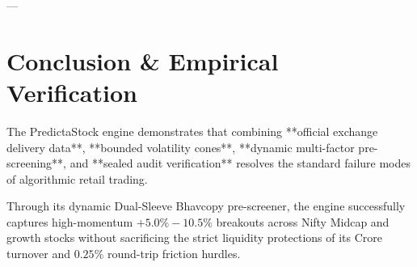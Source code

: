 \documentclass[11pt,a4paper]{article}
\begin{document}
---

\section{Conclusion \& Empirical Verification}

The PredictaStock engine demonstrates that combining **official exchange delivery data**, **bounded volatility cones**, **dynamic multi-factor pre-screening**, and **sealed audit verification** resolves the standard failure modes of algorithmic retail trading. 

Through its dynamic Dual-Sleeve Bhavcopy pre-screener, the engine successfully captures high-momentum $+5.0\% - 10.5\%$ breakouts across Nifty Midcap and growth stocks without sacrificing the strict liquidity protections of its  Crore turnover and $0.25\%$ round-trip friction hurdles.
\end{document}
